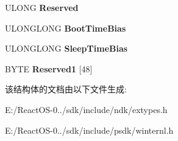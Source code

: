 \begin{DoxyCompactItemize}
U\+L\+O\+NG {\bfseries Reserved}
\item 
\mbox{\label{struct___s_y_s_t_e_m___t_i_m_e_o_f_d_a_y___i_n_f_o_r_m_a_t_i_o_n_a61c0fbf60406dc448f0c6bb45bc3d2ad}} 
U\+L\+O\+N\+G\+L\+O\+NG {\bfseries Boot\+Time\+Bias}
\item 
\mbox{\label{struct___s_y_s_t_e_m___t_i_m_e_o_f_d_a_y___i_n_f_o_r_m_a_t_i_o_n_a693a74c8688eccd81b42e6722c4182e8}} 
U\+L\+O\+N\+G\+L\+O\+NG {\bfseries Sleep\+Time\+Bias}
\item 
\mbox{\label{struct___s_y_s_t_e_m___t_i_m_e_o_f_d_a_y___i_n_f_o_r_m_a_t_i_o_n_ad95b8b41644f837c45e3add313288933}} 
B\+Y\+TE {\bfseries Reserved1} \mbox{[}48\mbox{]}
\end{DoxyCompactItemize}


该结构体的文档由以下文件生成\+:\begin{DoxyCompactItemize}
\item 
E\+:/\+React\+O\+S-\/0../sdk/include/ndk/extypes.\+h\item 
E\+:/\+React\+O\+S-\/0../sdk/include/psdk/winternl.\+h\end{DoxyCompactItemize}
